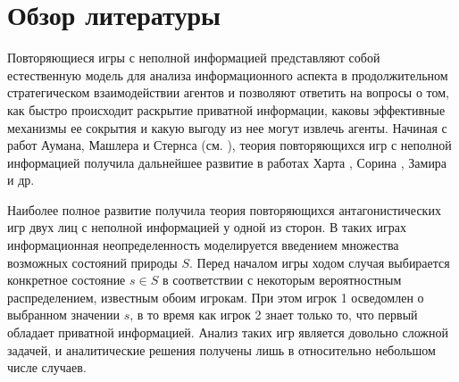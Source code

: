 \chapter*{Обзор литературы}

Повторяющиеся игры с неполной информацией представляют собой
естественную модель для анализа информационного аспекта в продолжительном
стратегическом взаимодействии агентов и позволяют ответить на вопросы о том, как
быстро происходит раскрытие приватной информации, каковы эффективные механизмы
ее сокрытия и какую выгоду из нее могут извлечь агенты. Начиная с работ Аумана,
Машлера и Стернса (см. \cite{aumann95}), теория повторяющихся игр с неполной
информацией получила дальнейшее развитие в работах Харта , Сорина
, Замира  и др.

Наиболее полное развитие получила теория повторяющихся антагонистических игр
двух лиц с неполной информацией у одной из сторон. В таких играх информационная
неопределенность моделируется введением множества возможных состояний природы
$S$. Перед началом игры ходом случая выбирается конкретное состояние $s \in S$ в
соответствии с некоторым вероятностным распределением, известным обоим игрокам.
При этом игрок 1 осведомлен о выбранном значении $s$, в то время как игрок 2
знает только то, что первый обладает приватной информацией. Анализ таких игр
является довольно сложной задачей, и аналитические решения получены лишь в
относительно небольшом числе случаев.

